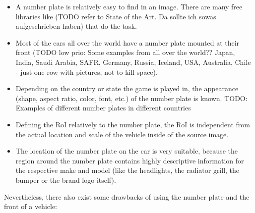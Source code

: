 \begin{itemize}
  \item A number plate is relatively easy to find in an image. There are many free libraries like (TODO refer to State of the Art. Da sollte ich sowas aufgeschrieben haben) that do the task.
  \item Most of the cars all over the world have a number plate mounted at their front (TODO low prio: Some examples from all over the world?? Japan, India, Saudi Arabia, SAFR, Germany, Russia, Iceland, USA, Australia, Chile - just one row with pictures, not to kill space).
  \item Depending on the country or state the game is played in, the appearance (shape, aspect ratio, color, font, etc.) of the number plate is known. TODO: Examples of different number plates in different countries
  \item Defining the RoI relatively to the number plate, the RoI is independent from the actual location and scale of the vehicle inside of the source image.
  \item The location of the number plate on the car is very suitable, because the region around the number plate contains highly descriptive information for the respective make and model (like the headlights, the radiator grill, the bumper or the brand logo itself).
\end{itemize}
Nevertheless, there also exist some drawbacks of using the number plate and the front of a vehicle:

